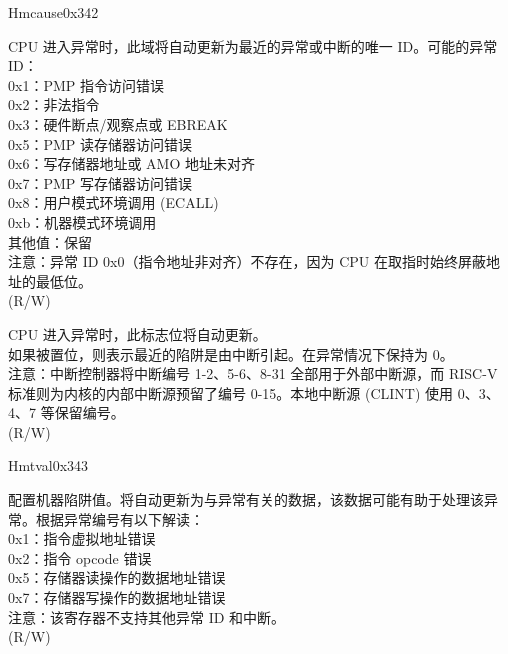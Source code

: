 \begin{register}{H}{mcause}{0x342}\label{regdesc:MCAUSE}
%
%
%
\regnewline%
\begin{regdesc}\begin{reglist}
\label{fielddesc:MCAUSECODE}\item [Exception Code] CPU 进入异常时，此域将自动更新为最近的异常或中断的唯一 ID。可能的异常 ID：\\
0x1：PMP 指令访问错误\\
0x2：非法指令\\
0x3：硬件断点/观察点或 EBREAK\\
0x5：PMP 读存储器访问错误\\
0x6：写存储器地址或 AMO 地址未对齐\\
0x7：PMP 写存储器访问错误\\
0x8：用户模式环境调用 (ECALL)\\
0xb：机器模式环境调用\\
其他值：保留\\
注意：异常 ID 0x0（指令地址非对齐）不存在，因为 CPU 在取指时始终屏蔽地址的最低位。\\
(R/W)
\label{fielddesc:MCAUSEINT}\item [Interrupt Flag]  CPU 进入异常时，此标志位将自动更新。\\
如果被置位，则表示最近的陷阱是由中断引起。在异常情况下保持为 0。\\
注意：中断控制器将中断编号 1-2、5-6、8-31 全部用于外部中断源，而 RISC-V 标准则为内核的内部中断源预留了编号 0-15。本地中断源 (CLINT) 使用 0、3、4、7 等保留编号。\\
(R/W) 
\end{reglist}\end{regdesc}
\end{register}

\begin{register}{H}{mtval}{0x343}\label{regdesc:MTVAL}
%
\regnewline%
\begin{regdesc}\begin{reglist}
\label{fielddesc:MTVAL}\item [MTVAL] 配置机器陷阱值。将自动更新为与异常有关的数据，该数据可能有助于处理该异常。根据异常编号有以下解读：\\
0x1：指令虚拟地址错误\\
0x2：指令 opcode 错误\\
0x5：存储器读操作的数据地址错误\\
0x7：存储器写操作的数据地址错误\\
注意：该寄存器不支持其他异常 ID 和中断。\\
(R/W)
\end{reglist}\end{regdesc}
\end{register}

